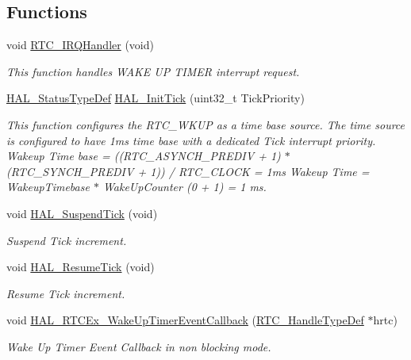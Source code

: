 \subsection*{Functions}
\begin{DoxyCompactItemize}
\item 
void \hyperlink{group___h_a_l___time_base___r_t_c___wake_up___template_gab86b9dd0d7b4eacfe38086e1fa4c2312}{R\+T\+C\+\_\+\+I\+R\+Q\+Handler} (void)
\begin{DoxyCompactList}\small\item\em This function handles W\+A\+KE UP T\+I\+M\+ER interrupt request. \end{DoxyCompactList}\item 
\hyperlink{stm32f0xx__hal__def_8h_a63c0679d1cb8b8c684fbb0632743478f}{H\+A\+L\+\_\+\+Status\+Type\+Def} \hyperlink{group___h_a_l___time_base___r_t_c___wake_up___template_ga879cdb21ef051eb81ec51c18147397d5}{H\+A\+L\+\_\+\+Init\+Tick} (uint32\+\_\+t Tick\+Priority)
\begin{DoxyCompactList}\small\item\em This function configures the R\+T\+C\+\_\+\+W\+K\+UP as a time base source. The time source is configured to have 1ms time base with a dedicated Tick interrupt priority. Wakeup Time base = ((R\+T\+C\+\_\+\+A\+S\+Y\+N\+C\+H\+\_\+\+P\+R\+E\+D\+IV + 1) $\ast$ (R\+T\+C\+\_\+\+S\+Y\+N\+C\+H\+\_\+\+P\+R\+E\+D\+IV + 1)) / R\+T\+C\+\_\+\+C\+L\+O\+CK = 1ms Wakeup Time = Wakeup\+Timebase $\ast$ Wake\+Up\+Counter (0 + 1) = 1 ms. \end{DoxyCompactList}\item 
void \hyperlink{group___h_a_l___time_base___r_t_c___wake_up___template_gaaf651af2afe688a991c657f64f8fa5f9}{H\+A\+L\+\_\+\+Suspend\+Tick} (void)
\begin{DoxyCompactList}\small\item\em Suspend Tick increment. \end{DoxyCompactList}\item 
void \hyperlink{group___h_a_l___time_base___r_t_c___wake_up___template_ga24e0ee9dae1ec0f9d19200f5575ff790}{H\+A\+L\+\_\+\+Resume\+Tick} (void)
\begin{DoxyCompactList}\small\item\em Resume Tick increment. \end{DoxyCompactList}\item 
void \hyperlink{group___h_a_l___time_base___r_t_c___wake_up___template_gac9ed5d6224b5c86f2845a9c1af7d94de}{H\+A\+L\+\_\+\+R\+T\+C\+Ex\+\_\+\+Wake\+Up\+Timer\+Event\+Callback} (\hyperlink{struct_r_t_c___handle_type_def}{R\+T\+C\+\_\+\+Handle\+Type\+Def} $\ast$hrtc)
\begin{DoxyCompactList}\small\item\em Wake Up Timer Event Callback in non blocking mode. \end{DoxyCompactList}\end{DoxyCompactItemize}
